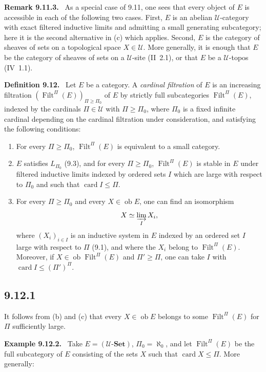 \documentclass[11pt]{article}
\newcommand{\U}{\mathcal{U}}
\newcommand{\Set}{\mathbf{Set}}
\newcommand{\ob}{\operatorname{ob}}
\newcommand{\Filt}{\operatorname{Filt}}
\newcommand{\card}{\operatorname{card}}
\newenvironment{statement}[1]{\par\medskip\noindent\textbf{#1.}\ }{\par\medskip}
\newenvironment{remarktext}[1]{\par\medskip\noindent\textbf{#1.}\ }{\par\medskip}
\begin{document}
\begin{remarktext}{Remark 9.11.3}
As a special case of 9.11, one sees that every object of $E$ is accessible in each of the following two cases. First, $E$ is an abelian $\U$-category with exact filtered inductive limits and admitting a small generating subcategory; here it is the second alternative in (c) which applies. Second, $E$ is the category of sheaves of sets on a topological space $X\in\U$. More generally, it is enough that $E$ be the category of sheaves of sets on a $\U$-site (II~2.1), or that $E$ be a $\U$-topos (IV~1.1).
\end{remarktext}

\begin{statement}{Definition 9.12}
Let $E$ be a category. A \emph{cardinal filtration} of $E$ is an increasing filtration $(\Filt^\Pi(E))_{\Pi\geq\Pi_0}$ of $E$ by strictly full subcategories $\Filt^\Pi(E)$, indexed by the cardinals $\Pi\in\U$ with $\Pi\geq\Pi_0$, where $\Pi_0$ is a fixed infinite cardinal depending on the cardinal filtration under consideration, and satisfying the following conditions:
\begin{enumerate}[label=\alph*)]
\item For every $\Pi\geq\Pi_0$, $\Filt^\Pi(E)$ is equivalent to a small category.

\item $E$ satisfies $L_{\Pi_0}$ (9.3), and for every $\Pi\geq\Pi_0$, $\Filt^\Pi(E)$ is stable in $E$ under filtered inductive limits indexed by ordered sets $I$ which are large with respect to $\Pi_0$ and such that $\card I\leq\Pi$.

\item For every $\Pi\geq\Pi_0$ and every $X\in\ob E$, one can find an isomorphism
\[
 X\simeq \varinjlim_I X_i,
\]
where $(X_i)_{i\in I}$ is an inductive system in $E$ indexed by an ordered set $I$ large with respect to $\Pi$ (9.1), and where the $X_i$ belong to $\Filt^\Pi(E)$. Moreover, if $X\in\ob\Filt^\Pi(E)$ and $\Pi'\geq\Pi$, one can take $I$ with $\card I\leq(\Pi')^\Pi$.
\end{enumerate}
\end{statement}

\subsection*{9.12.1}
It follows from (b) and (c) that every $X\in\ob E$ belongs to some $\Filt^\Pi(E)$ for $\Pi$ sufficiently large.

\begin{remarktext}{Example 9.12.2}
Take $E=(\U\text{-}\Set)$, $\Pi_0=\aleph_0$, and let $\Filt^\Pi(E)$ be the full subcategory of $E$ consisting of the sets $X$ such that $\card X\leq\Pi$. More generally:
\end{remarktext}
\end{document}
